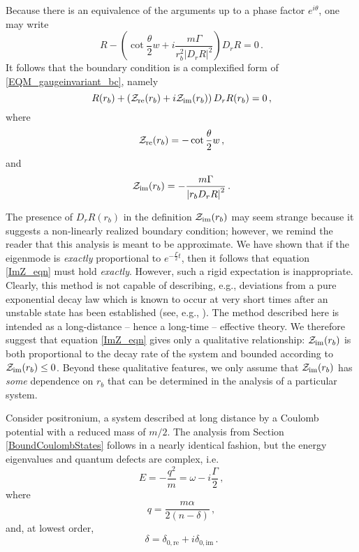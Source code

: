 \documentclass[pra,twocolumn,nofootinbib, superscriptaddress]{revtex4}%
\def\({\left(}
\def\){\right)}
\def\a{\alpha}
\def\f#1#2{\frac{#1}{#2}}
\def\de{\delta}
\def\o{\omega}
\def\th{\theta}
\providecommand{\abs}[1]{\left\lvert#1\right\rvert}
\begin{document}
Because there is an equivalence of the arguments up to a phase factor $e^{i\th}$, one may write
\begin{equation}
R-\(\cot{\f{\th}{2}}w +i\f{m\Gamma}{r_b^2\abs{D_r R}^2} \)D_r R=0\,.
\end{equation}
It follows that the boundary condition is a complexified form of \eqref{EQM_gaugeinvariant_bc}, namely
\begin{equation}\label{EQM_gaugeinvariant_bc_w_decay}
R(r_b)+\({\cal Z}_\text{re}(r_b)+i{\cal Z}_\text{im}(r_b)\)D_r R(r_b)=0\,,
\end{equation}
where
\begin{equation}
{\cal Z}_\text{re}(r_b)=-\cot{\f{\th}{2}}w\,,
\end{equation}
and
\begin{equation}\label{ImZ_eqn}
{\cal Z}_\text{im}(r_b)=-\f{m\Gamma}{\abs{r_b D_r R}^2}\,.
\end{equation}


 The presence of $D_r R\(r_b\)$ in the definition ${\cal Z}_\text{im}(r_b)$ may seem strange because it suggests a non-linearly realized boundary condition; however, we remind the reader that this analysis is meant to be approximate. We have shown that if the eigenmode is \emph{exactly} proportional to $e^{-\f{\Gamma}{2} t}$, then it follows that equation \eqref{ImZ_eqn} must hold \emph{exactly}. However, such a rigid expectation is inappropriate. Clearly, this method is not capable of describing, e.g., deviations from a pure exponential decay law which is known to occur at very short times after an unstable state has been established (see, e.g., \cite{Chiu:1977ds}). The method described here is intended as a long-distance -- hence a long-time --  effective theory. We therefore suggest that equation \eqref{ImZ_eqn} gives only a qualitative relationship: ${\cal Z}_\text{im}(r_b)$ is both proportional to the decay rate of the system and bounded according to ${\cal Z}_\text{im}(r_b)\leq0$. Beyond these qualitative features, we only assume that ${\cal Z}_\text{im}(r_b)$ has \emph{some} dependence on $r_b$ that can be determined in the analysis of a particular system.

Consider positronium, a system described at long distance by a Coulomb potential with a reduced mass of $m/2$. The analysis from Section \ref{BoundCoulombStates} follows in a nearly identical fashion, but the energy eigenvalues and quantum defects are complex, i.e.
\begin{equation}\label{cx_E}
E=-\f{q^2}{m}=\o  -i \f{\Gamma}{2}\,,
\end{equation}
where
\begin{equation}\label{Ps_q_ansatz}
q=\f{m\a}{2\(n-\de\)}\,,
\end{equation}
and, at lowest order,
\begin{equation}\label{cx_delta_0}
    \de = \de_{0,\text{re}} + i  \de_{0,\text{im}}\,.
\end{equation}
\end{document}

